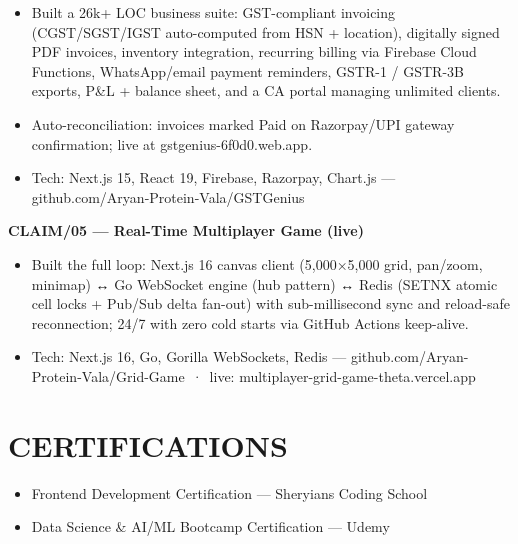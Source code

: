 \documentclass[9pt]{article}
\begin{document}
\begin{itemize}[leftmargin=11pt,itemsep=0pt,topsep=1pt,parsep=0pt]
\item Built a 26k+ LOC business suite: GST-compliant invoicing (CGST/SGST/IGST auto-computed from HSN + location), digitally signed PDF invoices, inventory integration, recurring billing via Firebase Cloud Functions, WhatsApp/email payment reminders, GSTR-1 / GSTR-3B exports, P\&L + balance sheet, and a CA portal managing unlimited clients.
\item Auto-reconciliation: invoices marked Paid on Razorpay/UPI gateway confirmation; live at gstgenius-6f0d0.web.app.
\item Tech: Next.js 15, React 19, Firebase, Razorpay, Chart.js  ---  github.com/Aryan-Protein-Vala/GSTGenius
\end{itemize}
\textbf{CLAIM/05  ---  Real-Time Multiplayer Game (live)}
\vspace{1pt}
\begin{itemize}[leftmargin=11pt,itemsep=0pt,topsep=1pt,parsep=0pt]
\item Built the full loop: Next.js 16 canvas client (5,000×5,000 grid, pan/zoom, minimap) ↔ Go WebSocket engine (hub pattern) ↔ Redis (SETNX atomic cell locks + Pub/Sub delta fan-out) with sub-millisecond sync and reload-safe reconnection; 24/7 with zero cold starts via GitHub Actions keep-alive.
\item Tech: Next.js 16, Go, Gorilla WebSockets, Redis  ---  github.com/Aryan-Protein-Vala/Grid-Game \,·\, live: multiplayer-grid-game-theta.vercel.app
\end{itemize}
\section*{CERTIFICATIONS}
\begin{itemize}[leftmargin=11pt,itemsep=0pt,topsep=1pt,parsep=0pt]
\item Frontend Development Certification  ---  Sheryians Coding School
\item Data Science \& AI/ML Bootcamp Certification  ---  Udemy
\end{itemize}
\end{document}
